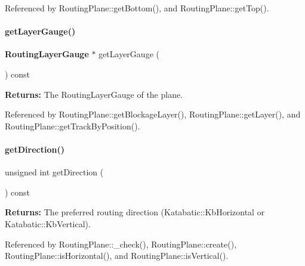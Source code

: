 Referenced by Routing\+Plane\+::get\+Bottom(), and Routing\+Plane\+::get\+Top().

\mbox{\label{classKite_1_1RoutingPlane_ae0b0e4f62672b952af5ba448e7fe4810}} 
\paragraph{\texorpdfstring{get\+Layer\+Gauge()}{getLayerGauge()}}
{\footnotesize\ttfamily \textbf{ Routing\+Layer\+Gauge} $\ast$ get\+Layer\+Gauge (\begin{DoxyParamCaption}{ }\end{DoxyParamCaption}) const\hspace{0.3cm}{\ttfamily [inline]}}

{\bfseries Returns\+:} The Routing\+Layer\+Gauge of the plane. 

Referenced by Routing\+Plane\+::get\+Blockage\+Layer(), Routing\+Plane\+::get\+Layer(), and Routing\+Plane\+::get\+Track\+By\+Position().

\mbox{\label{classKite_1_1RoutingPlane_a0dd7cf705ace42c662c289955313b2e9}} 
\paragraph{\texorpdfstring{get\+Direction()}{getDirection()}}
{\footnotesize\ttfamily unsigned int get\+Direction (\begin{DoxyParamCaption}{ }\end{DoxyParamCaption}) const\hspace{0.3cm}{\ttfamily [inline]}}

{\bfseries Returns\+:} The preferred routing direction (Katabatic\+::\+Kb\+Horizontal or Katabatic\+::\+Kb\+Vertical). 

Referenced by Routing\+Plane\+::\+\_\+check(), Routing\+Plane\+::create(), Routing\+Plane\+::is\+Horizontal(), and Routing\+Plane\+::is\+Vertical().

\mbox{\label{classKite_1_1RoutingPlane_a1c9c37c39d0eb83b0b4279e3e54e24a5}} 
